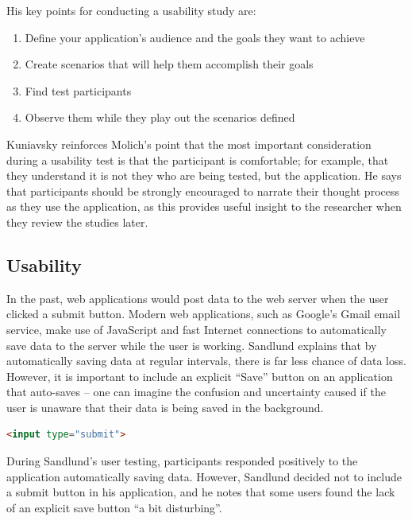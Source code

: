 \documentclass[]{scrartcl}
\begin{document}
His key points for conducting a usability study are:

\begin{enumerate}
  \item Define your application's audience and the goals they want to achieve
  \item Create scenarios that will help them accomplish their goals
  \item Find test participants
  \item Observe them while they play out the scenarios defined
\end{enumerate}

Kuniavsky reinforces Molich's point that the most important consideration
during a usability test is that the participant is comfortable; for example,
that they understand it is not they who are being tested, but the application.
He says that participants should be strongly encouraged to narrate their
thought process as they use the application, as this provides useful insight
to the researcher when they review the studies later.

\subsection{Usability}


In the past, web applications would \gls{post} data to the web server when the
user clicked a submit button. Modern web applications, such as Google's Gmail
email service, make use of JavaScript and fast Internet connections to
automatically save data to the server while the user is working. Sandlund
\cite{sandlund2009websoftware} explains that by automatically saving data at
regular intervals, there is far less chance of data loss. However, it is
important to include an explicit ``Save'' button on an application that
auto-saves -- one can imagine the confusion and uncertainty caused if the user
is unaware that their data is being saved in the background.

\begin{lstlisting}[language=HTML]
<input type="submit">
\end{lstlisting}

During Sandlund's user testing, participants responded positively to the
application automatically saving data. However, Sandlund decided not to
include a submit button in his application, and he notes that some users found
the lack of an explicit save button ``a bit disturbing''.
\end{document}
